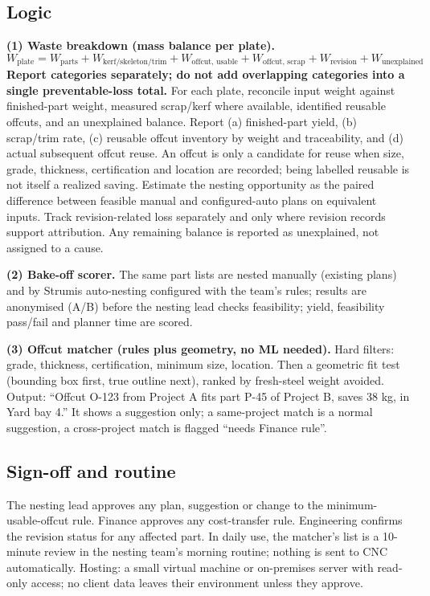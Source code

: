 \documentclass[10pt,a4paper]{article}
\begin{document}
\subsection{Logic}
\textbf{(1) Waste breakdown (mass balance per plate).}
\[
W_{\text{plate}} = W_{\text{parts}} + W_{\text{kerf/skeleton/trim}} + W_{\text{offcut, usable}} + W_{\text{offcut, scrap}} + W_{\text{revision}} + W_{\text{unexplained}}
\]
\textbf{Report categories separately; do not add overlapping categories into a single preventable-loss total.} For each plate, reconcile input weight against finished-part weight, measured scrap/kerf where available, identified reusable offcuts, and an unexplained balance. Report (a) finished-part yield, (b) scrap/trim rate, (c) reusable offcut inventory by weight and traceability, and (d) actual subsequent offcut reuse. An offcut is only a candidate for reuse when size, grade, thickness, certification and location are recorded; being labelled reusable is not itself a realized saving. Estimate the nesting opportunity as the paired difference between feasible manual and configured-auto plans on equivalent inputs. Track revision-related loss separately and only where revision records support attribution. Any remaining balance is reported as unexplained, not assigned to a cause.

\textbf{(2) Bake-off scorer.} The same part lists are nested manually (existing plans) and by Strumis auto-nesting configured with the team's rules; results are anonymised (A/B) before the nesting lead checks feasibility; yield, feasibility pass/fail and planner time are scored.

\textbf{(3) Offcut matcher (rules plus geometry, no ML needed).} Hard filters: grade, thickness, certification, minimum size, location. Then a geometric fit test (bounding box first, true outline next), ranked by fresh-steel weight avoided. Output: ``Offcut O-123 from Project A fits part P-45 of Project B, saves 38 kg, in Yard bay 4.'' It shows a suggestion only; a same-project match is a normal suggestion, a cross-project match is flagged ``needs Finance rule''.

\subsection{Sign-off and routine}
The nesting lead approves any plan, suggestion or change to the minimum-usable-offcut rule. Finance approves any cost-transfer rule. Engineering confirms the revision status for any affected part. In daily use, the matcher's list is a 10-minute review in the nesting team's morning routine; nothing is sent to CNC automatically. Hosting: a small virtual machine or on-premises server with read-only access; no client data leaves their environment unless they approve.
\end{document}
